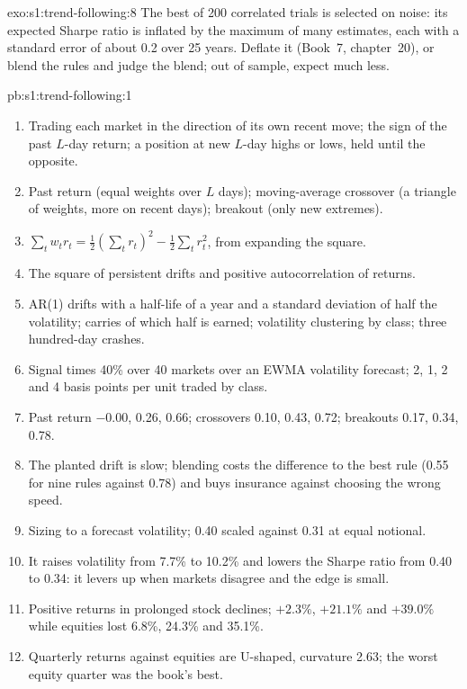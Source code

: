 \begin{solution}{exo:s1:trend-following:8}
The best of 200 correlated trials is selected on noise: its expected Sharpe ratio is inflated by the maximum of many estimates, each with a standard
error of about 0.2 over 25 years. Deflate it (Book~7, chapter~20), or blend the rules and judge the blend; out of sample, expect much less.
\end{solution}

\begin{solution}{pb:s1:trend-following:1}
\begin{enumerate}
\item Trading each market in the direction of its own recent move; the sign of the past $L$-day return; a position at new $L$-day highs or lows, held
until the opposite.
\item Past return (equal weights over $L$ days); moving-average crossover (a triangle of weights, more on recent days); breakout (only new extremes).
\item $\sum_t w_t r_t = \tfrac12(\sum_t r_t)^2 - \tfrac12\sum_t r_t^2$, from expanding the square.
\item The square of persistent drifts and positive autocorrelation of returns.
\item AR(1) drifts with a half-life of a year and a standard deviation of half the volatility; carries of which half is earned; volatility clustering by
class; three hundred-day crashes.
\item Signal times 40\% over 40 markets over an EWMA volatility forecast; 2, 1, 2 and 4 basis points per unit traded by class.
\item Past return $-0.00$, 0.26, 0.66; crossovers 0.10, 0.43, 0.72; breakouts 0.17, 0.34, 0.78.
\item The planted drift is slow; blending costs the difference to the best rule (0.55 for nine rules against 0.78) and buys insurance against
choosing the wrong speed.
\item Sizing to a forecast volatility; 0.40 scaled against 0.31 at equal notional.
\item It raises volatility from 7.7\% to 10.2\% and lowers the Sharpe ratio from 0.40 to 0.34: it levers up when markets disagree and the edge is small.
\item Positive returns in prolonged stock declines; $+2.3\%$, $+21.1\%$ and $+39.0\%$ while equities lost 6.8\%, 24.3\% and 35.1\%.
\item Quarterly returns against equities are U-shaped, curvature 2.63; the worst equity quarter was the book's best.

\end{enumerate}
\end{solution}
